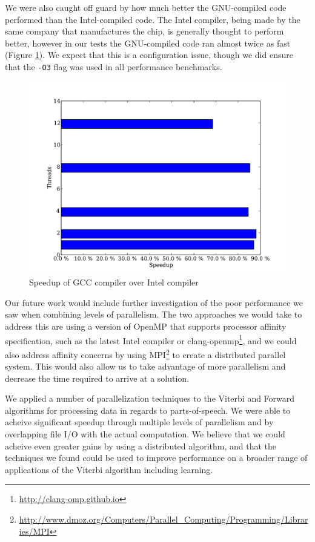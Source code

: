 \documentclass[11pt,onecolumn]{article}
\begin{document}
We were also caught off guard by how much better the GNU-compiled code performed than the Intel-compiled code. The Intel compiler, being made by the same company that manufactures the chip, is generally thought to perform better, however in our tests the GNU-compiled code ran almost twice as fast (Figure \ref{fig:gccvsintel}). We expect that this is a configuration issue, though we did ensure that the \texttt{-O3} flag was used in all performance benchmarks.

\begin{figure}[h!]
\centering
\includegraphics[width=.75\linewidth]{figures/comparison_of_intel_and_gnu_comiler_performance}
\caption{Speedup of GCC compiler over Intel compiler}
\label{fig:gccvsintel}
\end{figure}


Our future work would include further investigation of the poor performance we saw when combining levels of parallelism. The two approaches we would take to address this are using a version of OpenMP that supports processor affinity specification, such as the latest Intel compiler or clang-openmp\footnote{\url{http://clang-omp.github.io}}, and we could also address affinity concerns by using MPI\footnote{\url{http://www.dmoz.org/Computers/Parallel_Computing/Programming/Libraries/MPI}} to create a distributed parallel system. This would also allow us to take advantage of more parallelism and decrease the time required to arrive at a solution.


We applied a number of parallelization techniques to the Viterbi and Forward algorithms for processing data in regards to parts-of-speech. We were able to acheive significant speedup through multiple levels of parallelism and by overlapping file I/O with the actual computation. We believe that we could acheive even greater gains by using a distributed algorithm, and that the techniques we found could be used to improve performance on a broader range of applications of the Viterbi algorithm including learning.
\end{document}
